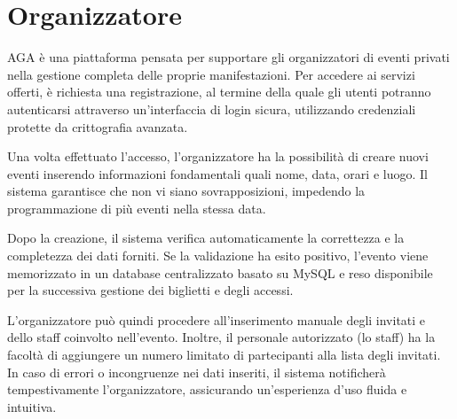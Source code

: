 \documentclass[a4paper]{article}
\begin{document}
\section{Organizzatore}
\textcolor{textcolor}{
AGA è una piattaforma pensata per supportare gli organizzatori di eventi privati nella gestione completa delle proprie manifestazioni. Per accedere ai servizi offerti, è richiesta una registrazione, al termine della quale gli utenti potranno autenticarsi attraverso un’interfaccia di login sicura, utilizzando credenziali protette da crittografia avanzata.

Una volta effettuato l’accesso, l’organizzatore ha la possibilità di creare nuovi eventi inserendo informazioni fondamentali quali nome, data, orari e luogo. Il sistema garantisce che non vi siano sovrapposizioni, impedendo la programmazione di più eventi nella stessa data.

Dopo la creazione, il sistema verifica automaticamente la correttezza e la completezza dei dati forniti. Se la validazione ha esito positivo, l’evento viene memorizzato in un database centralizzato basato su MySQL e reso disponibile per la successiva gestione dei biglietti e degli accessi.

L’organizzatore può quindi procedere all’inserimento manuale degli invitati e dello staff coinvolto nell’evento. Inoltre, il personale autorizzato (lo staff) ha la facoltà di aggiungere un numero limitato di partecipanti alla lista degli invitati. In caso di errori o incongruenze nei dati inseriti, il sistema notificherà tempestivamente l’organizzatore, assicurando un’esperienza d’uso fluida e intuitiva.
}
\end{document}
